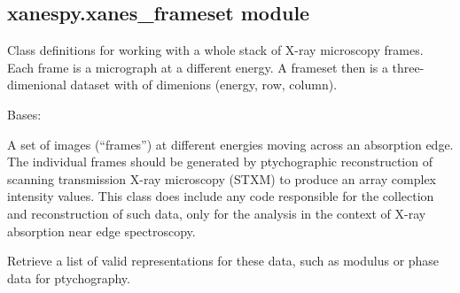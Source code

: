 \documentclass[letterpaper,10pt,english]{sphinxmanual}
\begin{document}
\subsection{xanespy.xanes\_frameset module}
\label{\detokenize{xanespy:xanespy-xanes-frameset-module}}\label{\detokenize{xanespy:module-xanespy.xanes_frameset}}
Class definitions for working with a whole stack of X-ray
microscopy frames. Each frame is a micrograph at a different energy. A
frameset then is a three-dimenional dataset with of dimenions (energy,
row, column).

\begin{fulllineitems}
\label{\detokenize{xanespy:xanespy.xanes_frameset.PtychoFrameset}}
Bases: {\hyperref[\detokenize{xanespy:xanespy.xanes_frameset.XanesFrameset}]{}}

A set of images (“frames”) at different energies moving across an
absorption edge. The individual frames should be generated by
ptychographic reconstruction of scanning transmission X-ray
microscopy (STXM) to produce an array complex intensity
values. This class does  include any code responsible for the
collection and reconstruction of such data, only for the analysis
in the context of X-ray absorption near edge spectroscopy.

\begin{fulllineitems}
\label{\detokenize{xanespy:xanespy.xanes_frameset.PtychoFrameset.representations}}
Retrieve a list of valid representations for these data, such as
modulus or phase data for ptychography.

\end{fulllineitems}


\end{fulllineitems}

\end{document}

